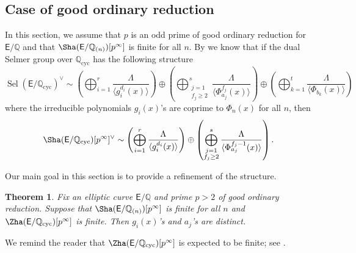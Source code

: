 \documentclass{amsart}
\newtheorem{theorem}{Theorem}[section]
\numberwithin{equation}{section}
\theoremstyle{remark}
\newcommand{\EC}{\mathsf{E}}
\newcommand{\Q}{\mathbb{Q}}
\newcommand{\cyc}{\operatorname{{cyc}}}
\newcommand{\Sel}{\operatorname{Sel}}
\theoremstyle{plain} %
\begin{document}
\subsection{Case of good ordinary reduction}
In this section, we assume that $p$ is an odd prime of good ordinary reduction for $\EC/\Q$ and that $\Sha(\EC/\Q_{(n)})[p^{\infty}]$ is finite for all $n$.
By \cite[Corollary~3.0.6]{Lee20} we know that if the dual Selmer group over $\Q_{\cyc}$ has the following structure
\begin{equation}
\label{Lee expression}
\Sel(\EC/\Q_{\cyc})^\vee \sim \left( \bigoplus_{i=1}^r \frac{\Lambda}{\langle g_i^{d_i}(x)\rangle}\right) \oplus \left(\bigoplus_{\substack{j=1\\ f_j\geq 2}}^s \frac{\Lambda}{\langle \Phi_{a_j}^{f_j}(x)\rangle}\right) \oplus \left(\bigoplus_{k=1}^t \frac{\Lambda}{\langle \Phi_{b_k}(x)\rangle} \right) 
\end{equation}
where the irreducible polynomials $g_i(x)$'s are coprime to $\Phi_n(x)$ for all $n$, then
\begin{equation}
\label{Lee sha}
\Sha(\EC/\Q_{\cyc})[p^\infty]^\vee \sim \left( \bigoplus_{i=1}^r \frac{\Lambda}{\langle g_i^{d_i}(x)\rangle}\right) \oplus \left(\bigoplus_{\substack{j=1\\ f_j\geq 2}}^s \frac{\Lambda}{\langle \Phi_{a_j}^{f_j -1}(x)\rangle}\right).
\end{equation}


Our main goal in this section is to provide a refinement of the structure.

\begin{theorem}
\label{aj's are unique}
Fix an elliptic curve $\EC/\Q$ and prime $p>2$ of good \emph{ordinary} reduction.
Suppose that $\Sha(\EC/\Q_{(n)})[p^{\infty}]$ is finite for all $n$ and $\Zha(\EC/\Q_{\cyc})[p^\infty]$ is finite.
Then $g_i(x)$'s and $a_j$'s are distinct.
\end{theorem}

We remind the reader that $\Zha(\EC/\Q_{\cyc})[p^\infty]$ is expected to be finite; see \cite[Question~8.3]{Wut07}.
\end{document}
